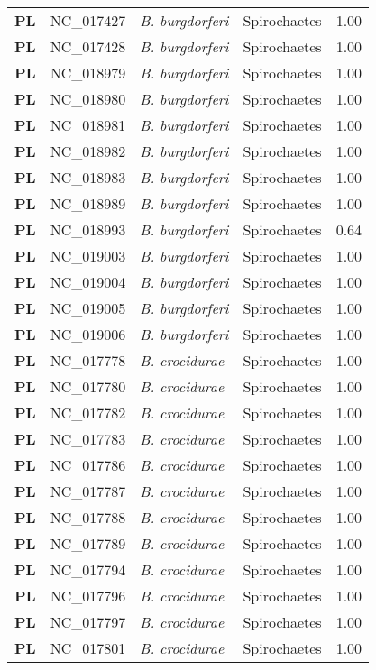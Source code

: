 \begin{adjustwidth}{-3cm}{2cm}
{\begin{supertabular}{>{\bfseries}l|p{0.1\textwidth}p{0.14\textwidth}l|l}
PL & NC\_017427 & \textit{B. burgdorferi} & Spirochaetes & 1.00\\
PL & NC\_017428 & \textit{B. burgdorferi} & Spirochaetes & 1.00\\
PL & NC\_018979 & \textit{B. burgdorferi} & Spirochaetes & 1.00\\
PL & NC\_018980 & \textit{B. burgdorferi} & Spirochaetes & 1.00\\
PL & NC\_018981 & \textit{B. burgdorferi} & Spirochaetes & 1.00\\
PL & NC\_018982 & \textit{B. burgdorferi} & Spirochaetes & 1.00\\
PL & NC\_018983 & \textit{B. burgdorferi} & Spirochaetes & 1.00\\
PL & NC\_018989 & \textit{B. burgdorferi} & Spirochaetes & 1.00\\
PL & NC\_018993 & \textit{B. burgdorferi} & Spirochaetes & 0.64\\
PL & NC\_019003 & \textit{B. burgdorferi} & Spirochaetes & 1.00\\
PL & NC\_019004 & \textit{B. burgdorferi} & Spirochaetes & 1.00\\
PL & NC\_019005 & \textit{B. burgdorferi} & Spirochaetes & 1.00\\
PL & NC\_019006 & \textit{B. burgdorferi} & Spirochaetes & 1.00\\
PL & NC\_017778 & \textit{B. crocidurae} & Spirochaetes & 1.00\\
PL & NC\_017780 & \textit{B. crocidurae} & Spirochaetes & 1.00\\
PL & NC\_017782 & \textit{B. crocidurae} & Spirochaetes & 1.00\\
PL & NC\_017783 & \textit{B. crocidurae} & Spirochaetes & 1.00\\
PL & NC\_017786 & \textit{B. crocidurae} & Spirochaetes & 1.00\\
PL & NC\_017787 & \textit{B. crocidurae} & Spirochaetes & 1.00\\
PL & NC\_017788 & \textit{B. crocidurae} & Spirochaetes & 1.00\\
PL & NC\_017789 & \textit{B. crocidurae} & Spirochaetes & 1.00\\
PL & NC\_017794 & \textit{B. crocidurae} & Spirochaetes & 1.00\\
PL & NC\_017796 & \textit{B. crocidurae} & Spirochaetes & 1.00\\
PL & NC\_017797 & \textit{B. crocidurae} & Spirochaetes & 1.00\\
PL & NC\_017801 & \textit{B. crocidurae} & Spirochaetes & 1.00\\

\end{supertabular}}
\end{adjustwidth}
